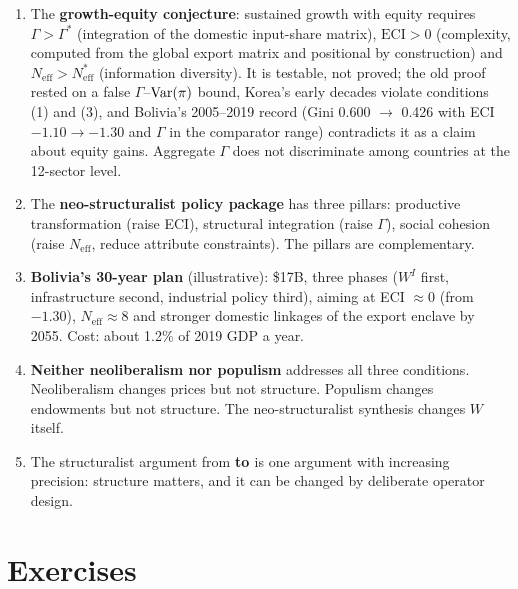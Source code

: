\documentclass[../structural_economics_book.tex]{subfiles}
\begin{document}
\begin{enumerate}
\item The \textbf{growth-equity conjecture}: sustained growth with equity requires $\Gamma > \Gamma^*$ (integration of the domestic input-share matrix), $\text{ECI} > 0$ (complexity, computed from the global export matrix and positional by construction) and $N_{\text{eff}} > N^*_{\text{eff}}$ (information diversity). It is testable, not proved; the old proof rested on a false $\Gamma$--$\operatorname{Var}(\pi)$ bound, Korea's early decades violate conditions (1) and (3), and Bolivia's 2005--2019 record (Gini 0.600 $\to$ 0.426 with ECI $-1.10 \to -1.30$ and $\Gamma$ in the comparator range) contradicts it as a claim about equity gains. Aggregate $\Gamma$ does not discriminate among countries at the 12-sector level.

\item The \textbf{neo-structuralist policy package} has three pillars: productive transformation (raise ECI), structural integration (raise $\Gamma$), social cohesion (raise $N_{\text{eff}}$, reduce attribute constraints). The pillars are complementary.

\item \textbf{Bolivia's 30-year plan} (illustrative): \$17B, three phases ($W^I$ first, infrastructure second, industrial policy third), aiming at ECI $\approx 0$ (from $-1.30$), $N_{\text{eff}} \approx 8$ and stronger domestic linkages of the export enclave by 2055. Cost: about 1.2\% of 2019 GDP a year.

\item \textbf{Neither neoliberalism nor populism} addresses all three conditions. Neoliberalism changes prices but not structure. Populism changes endowments but not structure. The neo-structuralist synthesis changes $W$ itself.

\item The structuralist argument from \textbf{\citet{prebisch1949desarrollo} to \citet{ocampo2009growth}} is one argument with increasing precision: structure matters, and it can be changed by deliberate operator design.
\end{enumerate}


\section{Exercises}
\label{ch26:sec:exercises}
\end{document}
